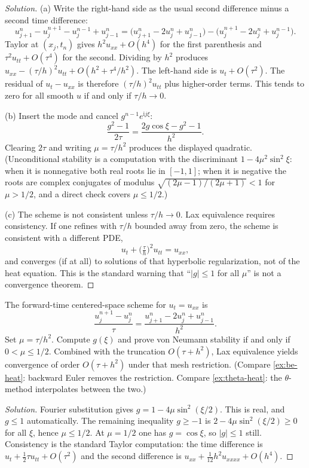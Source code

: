 \documentclass[11pt,a4paper]{article}
\begin{document}
\begin{proof}[Solution]
(a) Write the right-hand side as the usual second difference minus a second time difference:
\[
u_{j+1}^n-u_j^{n+1}-u_j^{n-1}+u_{j-1}^n
=
\bigl(u_{j+1}^n-2u_j^n+u_{j-1}^n\bigr)
-
\bigl(u_j^{n+1}-2u_j^n+u_j^{n-1}\bigr).
\]
Taylor at \((x_j,t_n)\) gives \(h^2 u_{xx}+O(h^4)\) for the first parenthesis and \(\tau^2 u_{tt}+O(\tau^4)\) for the second. Dividing by \(h^2\) produces \(u_{xx}-(\tau/h)^2 u_{tt}+O(h^2+\tau^4/h^2)\). The left-hand side is \(u_t+O(\tau^2)\). The residual of \(u_t-u_{xx}\) is therefore \((\tau/h)^2 u_{tt}\) plus higher-order terms. This tends to zero for all smooth \(u\) if and only if \(\tau/h\to 0\).

(b) Insert the mode and cancel \(g^{n-1}e^{\mathrm i j\xi}\):
\[
\frac{g^2-1}{2\tau}
=
\frac{2g\cos\xi-g^2-1}{h^2}.
\]
Clearing \(2\tau\) and writing \(\mu=\tau/h^2\) produces the displayed quadratic. (Unconditional stability is a computation with the discriminant \(1-4\mu^2\sin^2\xi\): when it is nonnegative both real roots lie in \([-1,1]\); when it is negative the roots are complex conjugates of modulus \(\sqrt{(2\mu-1)/(2\mu+1)}<1\) for \(\mu>1/2\), and a direct check covers \(\mu\le 1/2\).)

(c) The scheme is not consistent unless \(\tau/h\to 0\). Lax equivalence requires consistency. If one refines with \(\tau/h\) bounded away from zero, the scheme is consistent with a different PDE,
\[
u_t
+
\bigl(\tfrac{\tau}{h}\bigr)^2 u_{tt}
=
u_{xx},
\]
and converges (if at all) to solutions of that hyperbolic regularization, not of the heat equation. This is the standard warning that ``\(|g|\le 1\) for all \(\mu\)'' is not a convergence theorem.
\end{proof}

\begin{exercise}
\label{exer:ftcs}
The forward-time centered-space scheme for \(u_t=u_{xx}\) is
\[
\frac{u_j^{n+1}-u_j^n}{\tau}
=
\frac{u_{j+1}^n-2u_j^n+u_{j-1}^n}{h^2}.
\]
Set \(\mu=\tau/h^2\). Compute \(g(\xi)\) and prove von Neumann stability if and only if \(0<\mu\le 1/2\). Combined with the truncation \(O(\tau+h^2)\), Lax equivalence yields convergence of order \(O(\tau+h^2)\) under that mesh restriction. (Compare \cref{ex:be-heat}: backward Euler removes the restriction. Compare \cref{ex:theta-heat}: the \(\theta\)-method interpolates between the two.)
\end{exercise}

\begin{proof}[Solution]
Fourier substitution gives \(g=1-4\mu\sin^2(\xi/2)\). This is real, and \(g\le 1\) automatically. The remaining inequality \(g\ge -1\) is \(2-4\mu\sin^2(\xi/2)\ge 0\) for all \(\xi\), hence \(\mu\le 1/2\). At \(\mu=1/2\) one has \(g=\cos\xi\), so \(|g|\le 1\) still. Consistency is the standard Taylor computation: the time difference is \(u_t+\tfrac12\tau u_{tt}+O(\tau^2)\) and the second difference is \(u_{xx}+\tfrac{1}{12}h^2 u_{xxxx}+O(h^4)\).
\end{proof}
\end{document}
